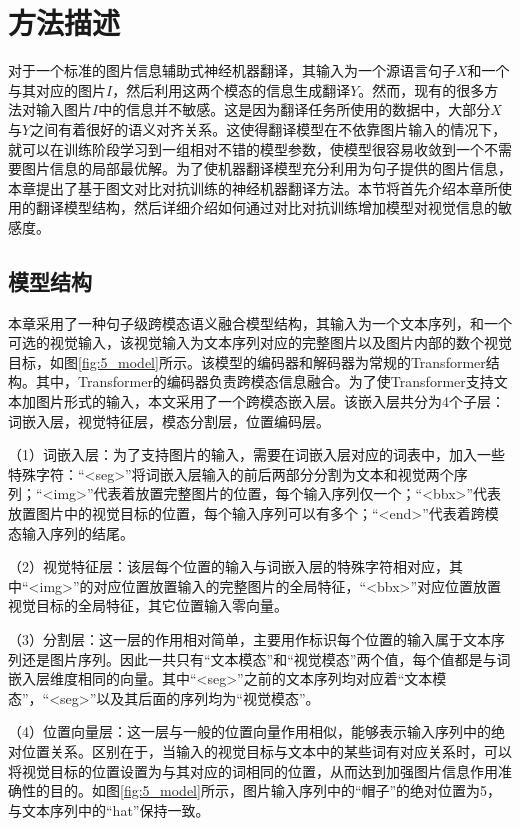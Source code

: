 \section{方法描述}
\label{sec:5_method}

对于一个标准的图片信息辅助式神经机器翻译，其输入为一个源语言句子$X$和一个与其对应的图片$I$，然后利用这两个模态的信息生成翻译$Y$。然而，现有的很多方法对输入图片$I$中的信息并不敏感。这是因为翻译任务所使用的数据中，大部分$X$与$Y$之间有着很好的语义对齐关系。这使得翻译模型在不依靠图片输入的情况下，就可以在训练阶段学习到一组相对不错的模型参数，使模型很容易收敛到一个不需要图片信息的局部最优解。为了使机器翻译模型充分利用为句子提供的图片信息，本章提出了基于图文对比对抗训练的神经机器翻译方法。本节将首先介绍本章所使用的翻译模型结构，然后详细介绍如何通过对比对抗训练增加模型对视觉信息的敏感度。

\subsection{模型结构}
\label{sec:5_architecture}

本章采用了一种句子级跨模态语义融合模型结构，其输入为一个文本序列，和一个可选的视觉输入，该视觉输入为文本序列对应的完整图片以及图片内部的数个视觉目标，如图\ref{fig:5_model}所示。该模型的编码器和解码器为常规的Transformer结构。其中，Transformer的编码器负责跨模态信息融合。为了使Transformer支持文本加图片形式的输入，本文采用了一个跨模态嵌入层。该嵌入层共分为4个子层：词嵌入层，视觉特征层，模态分割层，位置编码层。

（1）{\sffamily 词嵌入层：}为了支持图片的输入，需要在词嵌入层对应的词表中，加入一些特殊字符：“<seg>”将词嵌入层输入的前后两部分分割为文本和视觉两个序列；“<img>”代表着放置完整图片的位置，每个输入序列仅一个；“<bbx>”代表放置图片中的视觉目标的位置，每个输入序列可以有多个；“<end>”代表着跨模态输入序列的结尾。


（2）{\sffamily 视觉特征层：}该层每个位置的输入与词嵌入层的特殊字符相对应，其中“<img>”的对应位置放置输入的完整图片的全局特征，“<bbx>”对应位置放置视觉目标的全局特征，其它位置输入零向量。


（3）{\sffamily 分割层：}这一层的作用相对简单，主要用作标识每个位置的输入属于文本序列还是图片序列。因此一共只有“文本模态”和“视觉模态”两个值，每个值都是与词嵌入层维度相同的向量。其中“<seg>”之前的文本序列均对应着“文本模态”，“<seg>”以及其后面的序列均为“视觉模态”。


（4）{\sffamily 位置向量层：}这一层与一般的位置向量作用相似，能够表示输入序列中的绝对位置关系。区别在于，当输入的视觉目标与文本中的某些词有对应关系时，可以将视觉目标的位置设置为与其对应的词相同的位置，从而达到加强图片信息作用准确性的目的。如图\ref{fig:5_model}所示，图片输入序列中的“帽子”的绝对位置为5，与文本序列中的“hat”保持一致。

